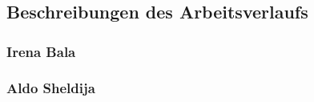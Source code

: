 \chapter{\docname}

\label{\docname}
\section{Beschreibungen des Arbeitsverlaufs}
\subsection{Irena Bala}



\subsection{Aldo Sheldija}

